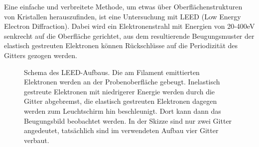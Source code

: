 \FloatBarrier

Eine einfache und verbreitete Methode, um etwas über Oberflächenstrukturen von
 Kristallen herauszufinden, ist eine Untersuchung mit LEED (Low Energy Electron
 Diffraction).
 Dabei wird ein Elektronenstrahl mit Energien von 20-400eV senkrecht auf die
 Oberfläche gerichtet, aus dem resultierende Beugungsmuster der elastisch
 gestreuten Elektronen können Rückschlüsse auf die Periodizität des Gitters
 gezogen werden.
 
 \begin{figure}[H]
\centering

\caption{Schema des LEED-Aufbaus. Die am Filament emittierten Elektronen werden an der
Probenoberfläche gebeugt. Inelastisch gestreute Elektronen mit niedrigerer Energie werden durch die
Gitter abgebremst, die elastisch gestreuten Elektronen dagegen werden zum Leuchtschirm
hin beschleunigt. Dort kann dann das Beugungsbild beobachtet werden. In der Skizze sind nur zwei
Gitter angedeutet, tatsächlich sind im verwendeten Aufbau vier Gitter verbaut.}
\label{leedaufbau}
\end{figure}

